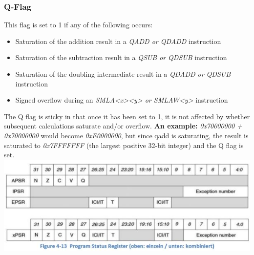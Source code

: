 \subsubsection{Q-Flag}
This flag is set to 1 if any of the following occurs:
\begin{itemize}
    \item Saturation of the addition result in a \textit{QADD or QDADD} instruction
    \item Saturation of the subtraction result in a \textit{QSUB or QDSUB} instruction
    \item Saturation of the doubling intermediate result in a \textit{QDADD or QDSUB} instruction
    \item Signed overflow during an \textit{SMLA<x><y> or SMLAW<y>} instruction
\end{itemize}
The Q flag is sticky in that once it has been set to 1, it is not affected by whether subsequent calculations saturate and/or overflow.\newline
\textbf{An example:}\newline
\textit{0x70000000 + 0x70000000} would become \textit{0xE0000000}, but since qadd is saturating, the result is saturated to \textit{0x7FFFFFFF} (the largest positive 32-bit integer) and the Q flag is set.
\clearpage
\includegraphics[width=19cm]{images/programstatusregister}

